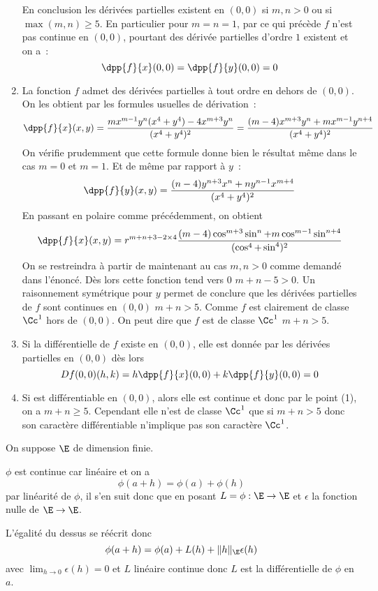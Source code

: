 \documentclass{article}
\begin{document}
\begin{enumerate}
En conclusion les dérivées partielles existent en $(0,0)$ si $m,n>0$ ou si $\max (m,n)\geq 5$. En particulier pour $m=n=1$, par ce qui précède $f$ n'est pas continue en $(0,0)$, pourtant des dérivée partielles d'ordre $1$ existent et on a~:
\[
\dpp{f}{x}(0,0) = \dpp{f}{y}(0,0) = 0
\]

\item La fonction $f$ admet des dérivées partielles à tout ordre en dehors de $(0,0)$. On les obtient par les formules usuelles de dérivation~:
\[
\dpp{f}{x}(x,y) = \dfrac{mx^{m-1}y^n(x^4+y^4) - 4x^{m+3}y^n}{(x^4+y^4)^2} = 
\dfrac{(m-4)x^{m+3}y^n +mx^{m-1}y^{n+4}}{(x^4+y^4)^2}
\]
On vérifie prudemment que cette formule donne bien le résultat même dans le cas $m=0$ et $m=1$. Et de même par rapport à $y$~:
\[
\dpp{f}{y}(x,y) = \dfrac{(n-4)y^{n+3}x^n +ny^{n-1}x^{m+4}}{(x^4+y^4)^2}
\]
En passant en polaire comme précédemment, on obtient
\[
\dpp{f}{x}(x,y) = r^{m+n+3-2\times 4} \dfrac{(m-4)\cos^{m+3}\sin^n +m\cos^{m-1}\sin^{n+4}}{(\cos^4+\sin^4)^2}
\]
On se restreindra à partir de maintenant au cas $m,n>0$ comme demandé dans l'énoncé. Dès lors cette fonction tend vers $0$ \ssi $m+n-5 >0$. Un raisonnement symétrique pour $y$ permet de conclure que les dérivées partielles de $f$ sont continues en $(0,0)$ \ssi $m+n >5$. Comme $f$ est clairement de classe $\Cc^1$ hors de $(0,0)$. On peut dire que $f$ est de classe $\Cc^1$ \ssi $m+n >5$.
\item Si la différentielle de $f$ existe en $(0,0)$, elle est donnée par les dérivées partielles en $(0,0)$ dès lors
\[
Df(0,0)(h,k) = h \dpp{f}{x}(0,0) + k \dpp{f}{y}(0,0) = 0
\]
\item Si est différentiable en $(0,0)$, alors elle est continue et donc par le point (1), on a $m+n \geq 5$. Cependant elle n'est de classe $\Cc^1$ que si $m+n > 5$ donc son caractère différentiable n'implique pas son caractère $\Cc^1$.
\end{enumerate}

\exercice{}
On suppose $\E$ de dimension finie.

$\phi$ est continue car linéaire et on a
\[
\phi(a+h) = \phi(a) + \phi(h)
\]
par linéarité de $\phi$, il s'en suit donc que en posant $L = \phi : \E \rightarrow \E$ et $\epsilon$ la fonction nulle de $\E \rightarrow \E$.

L'égalité du dessus se réécrit donc
\[
\phi(a+h) = \phi(a) + L(h) + \Vert h \Vert_\E \epsilon(h)
\]
avec $\lim_{h \to 0} \epsilon(h) = 0$ et $L$ linéaire continue donc $L$ est la différentielle de $\phi$ en $a$.
\end{document}
